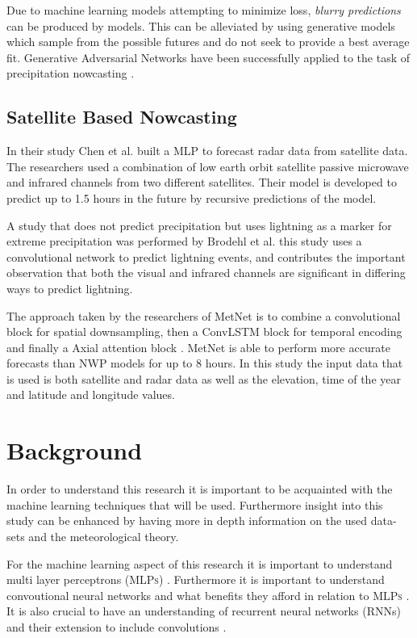 \documentclass[acmtog, authorversion]{acmart}
\begin{document}
Due to machine learning models attempting to minimize loss, \textit{blurry predictions} can be produced by models. This can be alleviated by using generative models which sample from the possible futures and do not seek to provide a best average fit. Generative Adversarial Networks have been successfully applied to the task of precipitation nowcasting \cite{Ravuri_2021}.

\subsection{Satellite Based Nowcasting}

In their study Chen et al. built a \cite{precipitationEstimationFromSat} MLP to forecast radar data from satellite data. The researchers used a combination of low earth orbit satellite passive microwave and infrared channels from two different satellites. Their model is developed to predict up to 1.5 hours in the future by recursive predictions of the model.
\medskip

A study that does not predict precipitation but uses lightning as a marker for extreme precipitation was performed by Brodehl et al. \cite{predictionLightning} this study uses a convolutional network to predict lightning events, and contributes the important observation that both the visual and infrared channels are significant in differing ways to predict lightning.
\medskip

The approach taken by the researchers of MetNet \cite{sønderby2020metnet} is to combine a convolutional block for spatial downsampling, then a ConvLSTM block for temporal encoding and finally a Axial attention block \cite{vaswani2017attention}. MetNet is able to perform more accurate forecasts than NWP models for up to 8 hours. In this study the input data that is used is both satellite and radar data as well as the elevation, time of the year and latitude and longitude values.

\section{Background}
In order to understand this research it is important to be acquainted with the machine learning techniques that will be used. Furthermore insight into this study can be enhanced by having more in depth information on the used data-sets and the meteorological theory.
\medskip

For the machine learning aspect of this research it is important to understand multi layer perceptrons (\textsc{MLPs}) \cite{schmidhuber2022annotated}. Furthermore it is important to understand convoutional neural networks and what benefits they afford in relation to \textsc{MLPs} \cite{oshea2015introduction}. It is also crucial to have an understanding of recurrent neural networks (RNNs) and their extension to include convolutions \cite{convlstm}.
\medskip
\end{document}
